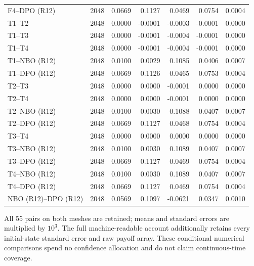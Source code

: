 \begin{longtable}{lrrrrrr}
F4--DPO (R12) & 2048 & 0.0669 & 0.1127 & 0.0469 & 0.0754 & 0.0004 \\
T1--T2 & 2048 & 0.0000 & -0.0001 & -0.0003 & -0.0001 & 0.0000 \\
T1--T3 & 2048 & 0.0000 & -0.0001 & -0.0004 & -0.0001 & 0.0000 \\
T1--T4 & 2048 & 0.0000 & -0.0001 & -0.0004 & -0.0001 & 0.0000 \\
T1--NBO (R12) & 2048 & 0.0100 & 0.0029 & 0.1085 & 0.0406 & 0.0007 \\
T1--DPO (R12) & 2048 & 0.0669 & 0.1126 & 0.0465 & 0.0753 & 0.0004 \\
T2--T3 & 2048 & 0.0000 & 0.0000 & -0.0001 & 0.0000 & 0.0000 \\
T2--T4 & 2048 & 0.0000 & 0.0000 & -0.0001 & 0.0000 & 0.0000 \\
T2--NBO (R12) & 2048 & 0.0100 & 0.0030 & 0.1088 & 0.0407 & 0.0007 \\
T2--DPO (R12) & 2048 & 0.0669 & 0.1127 & 0.0468 & 0.0754 & 0.0004 \\
T3--T4 & 2048 & 0.0000 & 0.0000 & 0.0000 & 0.0000 & 0.0000 \\
T3--NBO (R12) & 2048 & 0.0100 & 0.0030 & 0.1089 & 0.0407 & 0.0007 \\
T3--DPO (R12) & 2048 & 0.0669 & 0.1127 & 0.0469 & 0.0754 & 0.0004 \\
T4--NBO (R12) & 2048 & 0.0100 & 0.0030 & 0.1089 & 0.0407 & 0.0007 \\
T4--DPO (R12) & 2048 & 0.0669 & 0.1127 & 0.0469 & 0.0754 & 0.0004 \\
NBO (R12)--DPO (R12) & 2048 & 0.0569 & 0.1097 & -0.0621 & 0.0347 & 0.0010 \\
\bottomrule
\end{longtable}
\par\medskip\noindent\footnotesize All 55 pairs on both meshes are retained; means and standard errors are multiplied by $10^3$. The full machine-readable account additionally retains every initial-state standard error and raw payoff array. These conditional numerical comparisons spend no confidence allocation and do not claim continuous-time coverage.
\endgroup
